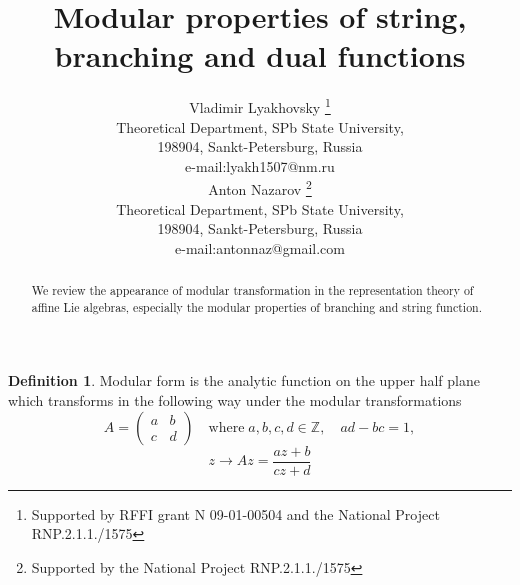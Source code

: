 \documentclass[a4paper,12pt]{article}
\theoremstyle{definition} \newtheorem{Def}{Definition}
\begin{document}
\title{Modular properties of string, branching and dual functions}

\author{Vladimir Lyakhovsky \thanks{ Supported by
 RFFI grant N 09-01-00504 and the National Project RNP.2.1.1./1575 }\\
Theoretical Department, SPb State University,\\
198904, Sankt-Petersburg, Russia \\
e-mail:lyakh1507@nm.ru \\
[5mm] Anton Nazarov \thanks{ Supported by
the National Project RNP.2.1.1./1575 }\\
Theoretical Department, SPb State University,\\
198904, Sankt-Petersburg, Russia \\
e-mail:antonnaz@gmail.com
}
\maketitle

\begin{abstract}
  We review the appearance of modular transformation in the representation theory of affine Lie algebras, especially the modular properties of branching and string function.
\end{abstract}
\begin{Def}
  Modular form is the analytic function on the upper half plane which transforms in the following way under the modular transformations
  \begin{equation}
    \label{eq:1}
    A=
    \begin{pmatrix} a & b\\ c & d
    \end{pmatrix} \quad\mbox{where}\; a,b,c,d\in\mathbb{Z},\quad ad-bc=1,
  \end{equation}
  \begin{equation}
    \label{eq:2}
    z\to A z=\frac{az+b}{cz+d}
  \end{equation}
\end{Def}
\end{document}
